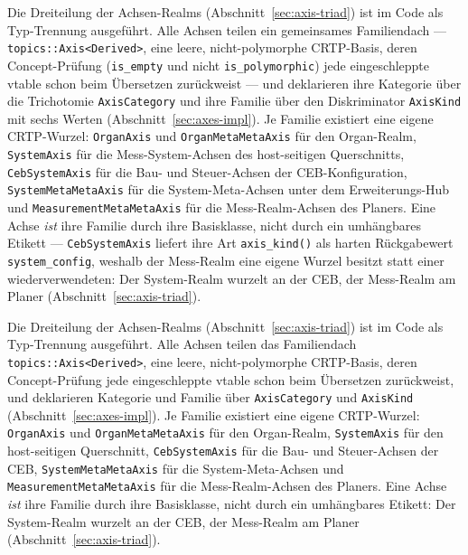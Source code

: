 \begin{nurlang}
Die Dreiteilung der Achsen-Realms (Abschnitt~\ref{sec:axis-triad}) ist im Code als Typ-Trennung
ausgeführt. Alle Achsen teilen ein gemeinsames Familiendach --- \texttt{topics::Axis<Derived>}, eine
leere, nicht-polymorphe CRTP-Basis, deren Concept-Prüfung (\texttt{is\_empty} und nicht
\texttt{is\_polymorphic}) jede eingeschleppte vtable schon beim Übersetzen zurückweist --- und
deklarieren ihre Kategorie über die Trichotomie \texttt{AxisCategory} und ihre Familie über den
Diskriminator \texttt{AxisKind} mit sechs Werten (Abschnitt~\ref{sec:axes-impl}). Je Familie existiert
eine eigene CRTP-Wurzel: \texttt{OrganAxis} und \texttt{OrganMetaMetaAxis} für den Organ-Realm,
\texttt{SystemAxis} für die Mess-System-Achsen des host-seitigen Querschnitts, \texttt{CebSystemAxis} für
die Bau- und Steuer-Achsen der CEB-Konfiguration, \texttt{SystemMetaMetaAxis} für die System-Meta-Achsen
unter dem Erweiterungs-Hub und \texttt{MeasurementMetaMetaAxis} für die Mess-Realm-Achsen des Planers.
Eine Achse \emph{ist} ihre Familie durch ihre Basisklasse, nicht durch ein umhängbares Etikett ---
\texttt{CebSystemAxis} liefert ihre Art \texttt{axis\_kind()} als harten Rückgabewert
\texttt{system\_config}, weshalb der Mess-Realm eine eigene Wurzel besitzt statt einer wiederverwendeten:
Der System-Realm wurzelt an der CEB, der Mess-Realm am Planer (Abschnitt~\ref{sec:axis-triad}).
\end{nurlang}
\begin{nurkurz}
Die Dreiteilung der Achsen-Realms (Abschnitt~\ref{sec:axis-triad}) ist im Code als Typ-Trennung
ausgeführt. Alle Achsen teilen das Familiendach \texttt{topics::Axis<Derived>}, eine leere,
nicht-polymorphe CRTP-Basis, deren Concept-Prüfung jede eingeschleppte vtable schon beim Übersetzen
zurückweist, und deklarieren Kategorie und Familie über \texttt{AxisCategory} und \texttt{AxisKind}
(Abschnitt~\ref{sec:axes-impl}). Je Familie existiert eine eigene CRTP-Wurzel: \texttt{OrganAxis} und
\texttt{OrganMetaMetaAxis} für den Organ-Realm, \texttt{SystemAxis} für den host-seitigen Querschnitt,
\texttt{CebSystemAxis} für die Bau- und Steuer-Achsen der CEB, \texttt{SystemMetaMetaAxis} für die
System-Meta-Achsen und \texttt{MeasurementMetaMetaAxis} für die Mess-Realm-Achsen des Planers. Eine Achse
\emph{ist} ihre Familie durch ihre Basisklasse, nicht durch ein umhängbares Etikett: Der System-Realm
wurzelt an der CEB, der Mess-Realm am Planer (Abschnitt~\ref{sec:axis-triad}).
\end{nurkurz}

